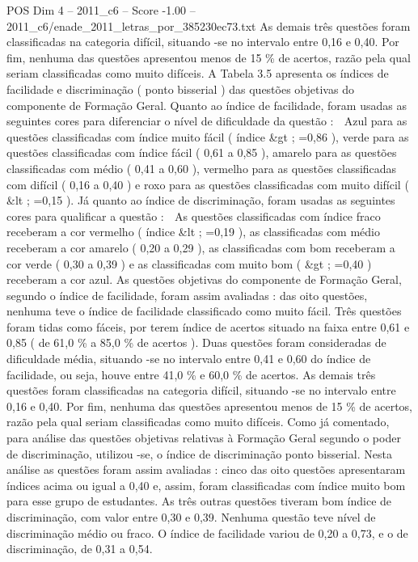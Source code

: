 \begin{textsample}{POS Dim 4 – 2011\_c6 – Score -1.00 – 2011\_c6/enade\_2011\_letras\_por\_385230ec73.txt}
As demais três questões foram classificadas na categoria difícil, situando -se no intervalo entre 0,16 e 0,40.
Por fim, nenhuma das questões apresentou menos de 15 \% de acertos, razão pela qual seriam classificadas como muito difíceis.
A Tabela 3.5 apresenta os índices de facilidade e discriminação ( ponto bisserial ) das questões objetivas do componente de Formação Geral.
Quanto ao índice de facilidade, foram usadas as seguintes cores para diferenciar o nível de dificuldade da questão :  Azul para as questões classificadas com índice muito fácil ( índice \&gt ; =0,86 ), verde para as questões classificadas com índice fácil ( 0,61 a 0,85 ), amarelo para as questões classificadas com médio ( 0,41 a 0,60 ), vermelho para as questões classificadas com difícil ( 0,16 a 0,40 ) e roxo para as questões classificadas com muito difícil ( \&lt ; =0,15 ).
Já quanto ao índice de discriminação, foram usadas as seguintes cores para qualificar a questão :  As questões classificadas com índice fraco receberam a cor vermelho ( índice \&lt ; =0,19 ), as classificadas com médio receberam a cor amarelo ( 0,20 a 0,29 ), as classificadas com bom receberam a cor verde ( 0,30 a 0,39 ) e as classificadas com muito bom ( \&gt ; =0,40 ) receberam a cor azul.
As questões objetivas do componente de Formação Geral, segundo o índice de facilidade, foram assim avaliadas : das oito questões, nenhuma teve o índice de facilidade classificado como muito fácil.
Três questões foram tidas como fáceis, por terem índice de acertos situado na faixa entre 0,61 e 0,85 ( de 61,0 \% a 85,0 \% de acertos ).
Duas questões foram consideradas de dificuldade média, situando -se no intervalo entre 0,41 e 0,60 do índice de facilidade, ou seja, houve entre 41,0 \% e 60,0 \% de acertos.
As demais três questões foram classificadas na categoria difícil, situando -se no intervalo entre 0,16 e 0,40.
Por fim, nenhuma das questões apresentou menos de 15 \% de acertos, razão pela qual seriam classificadas como muito difíceis.
Como já comentado, para análise das questões objetivas relativas à Formação Geral segundo o poder de discriminação, utilizou -se, o índice de discriminação ponto bisserial.
Nesta análise as questões foram assim avaliadas : cinco das oito questões apresentaram índices acima ou igual a 0,40 e, assim, foram classificadas com índice muito bom para esse grupo de estudantes.
As três outras questões tiveram bom índice de discriminação, com valor entre 0,30 e 0,39.
Nenhuma questão teve nível de discriminação médio ou fraco.
O índice de facilidade variou de 0,20 a 0,73, e o de discriminação, de 0,31 a 0,54.

\end{textsample}
